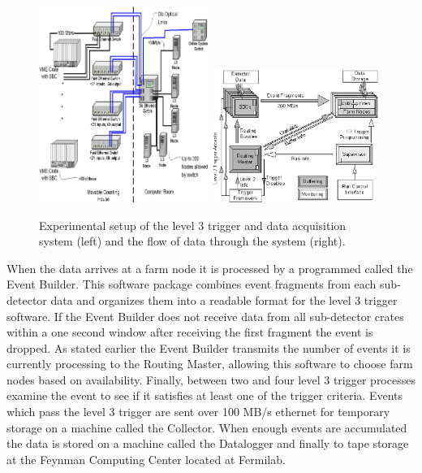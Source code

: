 \begin{figure}[!h!tbp]
\begin{center}
\includegraphics[width=0.49\textwidth]{eps/Level3/L3-DAQ.eps}
\includegraphics[width=0.49\textwidth]{eps/Level3/daq_software.eps}
\vspace{-0.1in}
\caption{Experimental setup of the level 3 trigger and data acquisition system (left) and the flow of data through the system (right).}
\label{l3all}
\end{center}
\end{figure}

When the data arrives at a farm node it is processed by a programmed called the Event Builder. This software package combines event fragments from each sub-detector data and organizes them into a readable format for the level 3 trigger software. If the Event Builder does not receive data from all sub-detector crates within a one second window after receiving the first fragment the event is dropped. As stated earlier the Event Builder transmits the number of events it is currently processing to the Routing Master, allowing this software to choose farm nodes based on availability. Finally, between two and four level 3 trigger processes examine the event to see if it satisfies at least one of the trigger criteria. Events which pass the level 3 trigger are sent over 100 MB/s ethernet for temporary storage on a machine called the Collector. When enough events are accumulated the data is stored on a machine called the Datalogger and finally to tape storage at the Feynman Computing Center located at Fermilab.